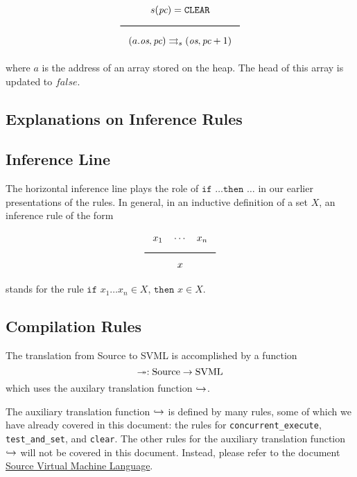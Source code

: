 $$\Rule{s(\textit{pc}) = \texttt{CLEAR}}{(a.\textit{os},\textit{pc}) \transition (\textit{os},\textit{pc} + 1)}$$
where \(a\) is the address of an array stored on the heap. The head of this array is updated to \(\textit{false}\).

\begin{appendices}
\section{Explanations on Inference Rules}
\label{sec:org10e3758}

\subsection{Inference Line}
\label{sec:orgce78d8d}
The horizontal inference line plays the role of \(\texttt{if } \ldots \texttt{then } \ldots\) in our earlier presentations of the rules. In general, in an inductive definition of a set \(X\), an inference rule of the form
$$\Rule{x_1 \quad \cdots \quad x_n}{x}$$
stands for the rule \(\texttt{if } x_1 \ldots x_n\in X \texttt{, then }x \in X\).

\subsection{Compilation Rules}
\label{sec:orgcf76b4e}
The translation from Source to SVML is accomplished by a function
$$\twoheadrightarrow: \textrm{Source} \rightarrow \textrm{SVML}$$
which uses the auxilary translation function \(\hookrightarrow\).

The auxiliary translation function \(\hookrightarrow\) is defined by many rules, some of which we have already covered in this document: the rules for \texttt{concurrent\_execute}, \texttt{test\_and\_set}, and \texttt{clear}.
The other rules for the auxiliary translation function \(\hookrightarrow\) will not be covered in this document. Instead, please refer to the document \href{svml-spec.pdf}{Source Virtual Machine Language}.


\end{appendices}
